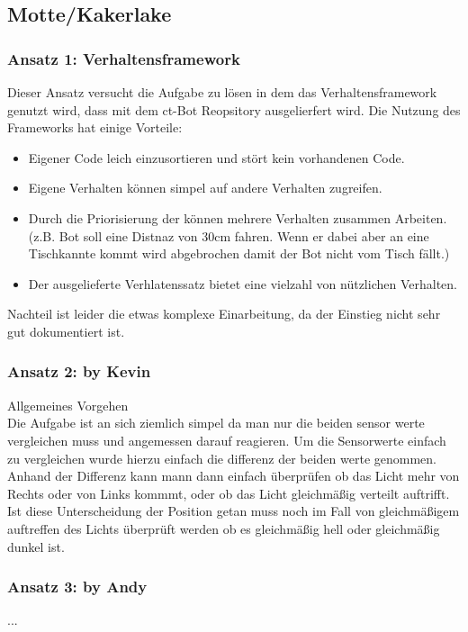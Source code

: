 \subsection{Motte/Kakerlake}
\label{motte_kakerlake}

\subsubsection{Ansatz 1: Verhaltensframework}
Dieser Ansatz versucht die Aufgabe zu lösen in dem das Verhaltensframework
genutzt wird, dass mit dem ct-Bot Reopsitory ausgelierfert wird. Die Nutzung des 
Frameworks hat einige Vorteile:
\begin{itemize}
	\item Eigener Code leich einzusortieren und stört kein vorhandenen Code.
	\item Eigene Verhalten können simpel auf andere Verhalten zugreifen.
	\item Durch die Priorisierung der können mehrere Verhalten zusammen Arbeiten.
		(z.B. Bot soll eine Distnaz von 30cm fahren. Wenn er dabei aber an eine
		Tischkannte kommt wird abgebrochen damit der Bot nicht vom Tisch fällt.)
	\item Der ausgelieferte Verhlatenssatz bietet eine vielzahl von nützlichen
		Verhalten.
\end{itemize}
Nachteil ist leider die etwas komplexe Einarbeitung, da der Einstieg nicht sehr gut
dokumentiert ist.

\subsubsection{Ansatz 2: by Kevin}

Allgemeines Vorgehen \\
Die Aufgabe ist an sich ziemlich simpel da man nur die beiden sensor werte vergleichen muss und angemessen darauf reagieren.
Um die Sensorwerte einfach zu vergleichen wurde hierzu einfach die differenz der beiden werte genommen.
Anhand der Differenz kann mann dann einfach überprüfen ob das Licht mehr von Rechts oder von Links kommmt, oder ob das Licht gleichmäßig verteilt auftrifft.
Ist diese Unterscheidung der Position getan muss noch im Fall von gleichmäßigem auftreffen des Lichts überprüft werden ob es gleichmäßig hell oder gleichmäßig dunkel ist.



\subsubsection{Ansatz 3: by Andy}
...

